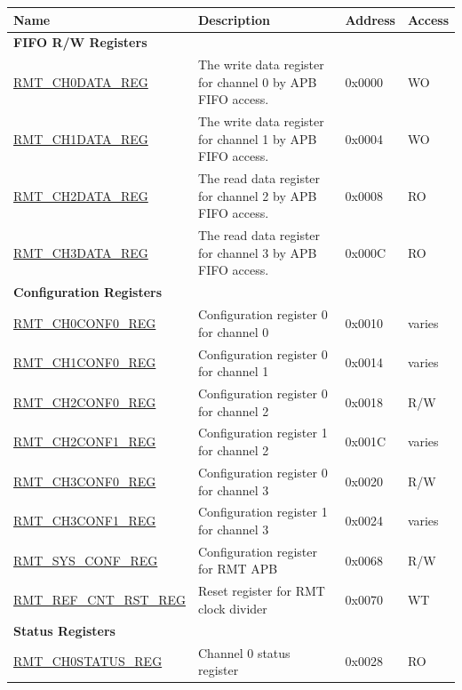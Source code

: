 \begin{longtable}{ | p{5.5cm} | p{6.8cm} | p{1.3cm} | p{1.5cm} | }
\hline\rowcolor{lightgray}
\textbf{Name} & \textbf{Description} &  \textbf{Address} & \textbf{Access} \\ \hline
\endhead
\multicolumn{4}{|l|}{\textbf{FIFO R/W Registers}} \\ \hline
\hyperref[regdesc:RMTCHNDATAREG]{RMT\_CH0DATA\_REG} & The write data register for channel 0 by APB FIFO access. & 0x0000 & WO \\ \hline
\hyperref[regdesc:RMTCHNDATAREG]{RMT\_CH1DATA\_REG} & The write data register for channel 1 by APB FIFO access. & 0x0004 & WO \\ \hline
\hyperref[regdesc:RMTCHMDATAREG]{RMT\_CH2DATA\_REG} & The read data register for channel 2 by APB FIFO access. & 0x0008 & RO \\ \hline
\hyperref[regdesc:RMTCHMDATAREG]{RMT\_CH3DATA\_REG} & The read data register for channel 3 by APB FIFO access. & 0x000C & RO \\ \hline
\multicolumn{4}{|l|}{\textbf{Configuration Registers}} \\ \hline
\hyperref[regdesc:RMTCHNCONF0REG]{RMT\_CH0CONF0\_REG} & Configuration register 0 for channel 0& 0x0010 & varies \\ \hline
\hyperref[regdesc:RMTCHNCONF0REG]{RMT\_CH1CONF0\_REG} & Configuration register 0 for channel 1& 0x0014 & varies \\ \hline
\hyperref[regdesc:RMTCHMCONF0REG]{RMT\_CH2CONF0\_REG} & Configuration register 0 for channel 2& 0x0018 & R/W \\ \hline
\hyperref[regdesc:RMTCHMCONF1REG]{RMT\_CH2CONF1\_REG} & Configuration register 1 for channel 2& 0x001C & varies \\ \hline
\hyperref[regdesc:RMTCHMCONF0REG]{RMT\_CH3CONF0\_REG} & Configuration register 0 for channel 3& 0x0020 & R/W \\ \hline
\hyperref[regdesc:RMTCHMCONF1REG]{RMT\_CH3CONF1\_REG} & Configuration register 1 for channel 3& 0x0024 & varies \\ \hline
\hyperref[regdesc:RMTSYSCONFREG]{RMT\_SYS\_CONF\_REG} & Configuration register for RMT APB  & 0x0068 & R/W \\ \hline
\hyperref[regdesc:RMTREFCNTRSTREG]{RMT\_REF\_CNT\_RST\_REG} & Reset register for RMT clock divider  & 0x0070 & WT \\ \hline
\multicolumn{4}{|l|}{\textbf{Status Registers}} \\ \hline
\hyperref[regdesc:RMTCHNSTATUSREG]{RMT\_CH0STATUS\_REG} & Channel 0 status register & 0x0028 & RO \\ \hline

\end{longtable}
